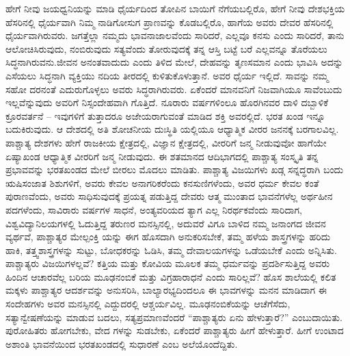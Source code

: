 ಹೇಗೆ ನೀವು ಜಯಧ್ವನಿಯನ್ನು ಮಾಡಿ ಧೈರ್ಯದಿಂದ ತೋಪಿನ ಬಾಯಿಗೆ ನೆಗೆಯಬಲ್ಲಿರೊ, ಹೇಗೆ ನೀವು ದೇಶಭಕ್ತಿಯ ಹೆಸರಿನಲ್ಲಿ ಧೈರ್ಯವಾಗಿ ನಿಮ್ಮ ನಾಡಿಗೋಸುಗ ಪ್ರಾಣವನ್ನು ಕೊಡಬಲ್ಲಿರೊ, ಹಾಗೆಯ ಅವರು ದೇವರ ಹೆಸರಿನಲ್ಲಿ ಧೈರ್ಯವಾಗಿರುವರು. ಜಗತ್ತೆಲ್ಲಾ ನಮ್ಮದು ಭಾವನಾಜಾಲವೆಂದು ಸಾರಿದರೆ, ಎಲ್ಲವೂ ಕನಸು ಎಂದು ಸಾರಿದರೆ, ತಾನು ಆಲೋಚಿಸಿರುವುದು, ನಂಬಿರುವುದು ಸತ್ಯವೆಂದು ತೋರುವುದಕ್ಕೆ ತನ್ನ ಆಸ್ತಿ ಬಟ್ಟೆ ಬರೆ ಎಲ್ಲವನ್ನೂ ತೊರೆಯಲು ಸಿದ್ಧನಾಗಿರುವನು.ಜೀವನ ಅನಂತವಾದುದು ಎಂದು ತಿಳಿದ ಮೇಲೆ, ದೇಹವನ್ನು ತೃಣಸಮಾನ ಎಂದು ಭಾವಿಸಿ ಅದನ್ನು ಎಸೆಯಲು ಸಿದ್ಧನಾಗಿ ವ್ಯಕ್ತಿಯು ನದಿಯ ತೀರದಲ್ಲಿ ಕುಳಿತುಕೊಳುತ್ತಾನೆ. ಅವರ ಧೈರ್ಯ ಇಲ್ಲಿದೆ. ಸಾವನ್ನು ನಮ್ಮ ಸಹೋ ದರನಂತೆ ಎದುರುಗೊಳ್ಳಲು ಅವರು ಸಿದ್ಧರಾಗಿರುವರು. ಏಕೆಂದರೆ ಮಾನವನಿಗೆ ನಿಜವಾಗಿಯೂ ಸಾವೆಂಬುದು ಇಲ್ಲವೆನ್ನುವುದು ಅವರಿಗೆ ನಿಸ್ಸಂದೇಹವಾಗಿ ಗೊತ್ತಿದೆ. ನೂರಾರು ವರ್ಷಗಳಿಂಲೂ ಹೊರಗಿನವರ ದಾಳಿ ದಬ್ಬಾಳಿಕೆ ಕ್ರೂರವರ್ತನೆ – ಇವುಗಳಿಗೆ ತುತ್ತಾದರೂ ಅಜೇಯರಾಗುವಂತೆ ಮಾಡಿದ ಶಕ್ತಿ ಅವರಲ್ಲಿದೆ. ಭರತ ಖಂಡ ಇನ್ನೂ ಬದುಕಿರುವುದು. ಆ ದೇಶದಲ್ಲಿ ಅತಿ ಶೋಚನೀಯ ದುಃಸ್ಥಿತಿ ಯಲ್ಲಿಯೂ ಆಧ್ಯಾತ್ಮಿಕ ವೀರರ ಜನನಕ್ಕೆ ಬರಗಾಲವಿಲ್ಲ. ಪಾಶ್ಚಾತ್ಯ ದೇಶಗಳು ಹೇಗೆ ರಾಜಕೀಯ ಕ್ಷೇತ್ರದಲ್ಲಿ, ವಿಜ್ಞಾನ ಕ್ಷೇತ್ರದಲ್ಲಿ, ವೀರರಿಗೆ ಜನ್ಮ ನೀಡುವುವೋ ಹಾಗೆಯೇ ಏಷ್ಯಾಖಂಡ ಆಧ್ಯಾತ್ಮಿಕ ವೀರರಿಗೆ ಜನ್ಮ ನೀಡುವುದು. ಈ ಶತಮಾನದ ಆದಿಭಾಗದಲ್ಲಿ ಪಾಶ್ಚಾತ್ಯ ಸಂಸ್ಕೃತಿ ತನ್ನ ಪ್ರಭಾವವನ್ನು ಭರತಖಂಡದ ಮೇಲೆ ಬೀರಲು ಮೊದಲು ಮಾಡಿತು. ಪಾಶ್ಚಾತ್ಯ ವಿಜಯಿಗಳು ಖಡ್ಗ ಸನ್ನದ್ಧರಾಗಿ ಬಂದು ಋಷಿಸಂಜಾತ ಶಿಶುಗಳಿಗೆ, ಅವರು ಕೇವಲ ಅನಾಗರಿಕರೆಂದು ಕನಸುಣಿಗಳೆಂದು, ಅವರ ಧರ್ಮ ಕೇವಲ ಕಂತೆ ಪುರಾಣವೆಂದು, ಅವರು ಸಾಧಿಸುವುದಕ್ಕೆ ಪ್ರಯತ್ನ ಪಡುತ್ತಿದ್ದ ದೇವರು ಆತ್ಮ ಮುಂತಾದ ಭಾವನೆಗಳೆಲ್ಲ ಅರ್ಥಹೀನ ಪದಗಳೆಂದು, ಸಾವಿರಾರು ವರ್ಷಗಳ ಸಾಧನೆ, ಅಂತ್ಯವರಿಯದ ತ್ಯಾಗ ಎಲ್ಲ ನಿರರ್ಥಕವೆಂದು ಸಾರಿದಾಗ, ವಿಶ್ವವಿದ್ಯಾನಿಲಯಗಳಲ್ಲಿ ಓದುತ್ತಿದ್ದ ತರುಣರ ಮನಸ್ಸಿನಲ್ಲಿ, ಅದುವರೆ ವಿಗೂ ಬಾಳಿದ ನಮ್ಮ ಜನಾಂಗದ ಜೀವನ ವ್ಯರ್ಥವೆ, ಪಾಶ್ಚಾತ್ಯರ ಮೇಲ್ಪಂಕ್ತಿ ಯನ್ನು ಈಗ ಹೊಸದಾಗಿ ಅನುಕರಿಸಬೇಕೆ, ತಮ್ಮ ಹಳೆಯ ಶಾಸ್ತ್ರಗಳನ್ನು ಹರಿದು ಹಾಕಿ, ತತ್ತ್ವಶಾಸ್ತ್ರಗಳನ್ನು ಸುಟ್ಟು, ಬೋಧಕರನ್ನು ಓಡಿಸಿ, ತಮ್ಮ ದೇವಾಲಯಗಳನ್ನು ಒಡೆಯಬೇಕೆ ಎಂದು ಅನ್ನಿಸಿತು. ಪಾಶ್ಚಾತ್ಯರು ವಿಜಯಿಗಳಲ್ಲವೆ? ಕತ್ತಿಯ ಮತ್ತು ಕೋವಿಯ ಮೂಲಕ ತಮ್ಮ ಧರ್ಮವನ್ನು ಪ್ರದರ್ಶಿಸುತ್ತಿದ್ದ ಅವರು ಹಿಂದಿನ ಆಚಾರವೆಲ್ಲ ಬರಿಯ ಮೂಢನಂಬಿಕೆ ಮತ್ತು ವಿಗ್ರಹಾರಾಧನೆ ಎಂದು ಸಾರಿಲ್ಲವೆ? ಹೊಸ ಶಾಲೆಯಲ್ಲಿ ಕಲಿತ ಮಕ್ಕಳು ಪಾಶ್ಚಾತ್ಯರ ಆದರ್ಶವನ್ನು ಅನುಸರಿಸಿ, ಬಾಲ್ಯಾರಭ್ಯದಿಂದಲೂ ಈ ಭಾವಗಳನ್ನು ಮನನ ಮಾಡಿದಾಗ ಈ ಸಂದೇಹಗಳು ಅವರ ಮನಸ್ಸಿನಲ್ಲಿ ಎದ್ದುದರಲ್ಲಿ ಆಶ್ಚರ್ಯವಿಲ್ಲ. ಮೂಢನಂಬಿಕೆಯನ್ನು ಆಚೆಗೆಸೆದು, ಸತ್ಯಾನ್ವೇಷಣೆಯನ್ನು ಮಾಡುವ ಬದಲು, ಸತ್ಯಪ್ರಮಾಣವೆಂದರೆ “ಪಾಶ್ಚಾತ್ಯರು ಏನು ಹೇಳುತ್ತಾರೆ?” ಎಂಬುದಾಯಿತು. ಪುರೋಹಿತರು ಹೋಗಬೇಕು, ವೇದ ಗಳನ್ನು ಸುಡಬೇಕು, ಏಕೆಂದರೆ ಪಾಶ್ಚಾತ್ಯರು ಹೀಗೆ ಹೇಳುತ್ತಾರೆ. ಹೀಗೆ ಉಂಟಾದ ಅಶಾಂತಿ ಭಾವನೆಯಿಂದ ಭರತಖಂಡದಲ್ಲಿ ಸುಧಾರಣೆ ಎಂಬ ಅಲೆಯೊಂದೆದ್ದಿತು.

